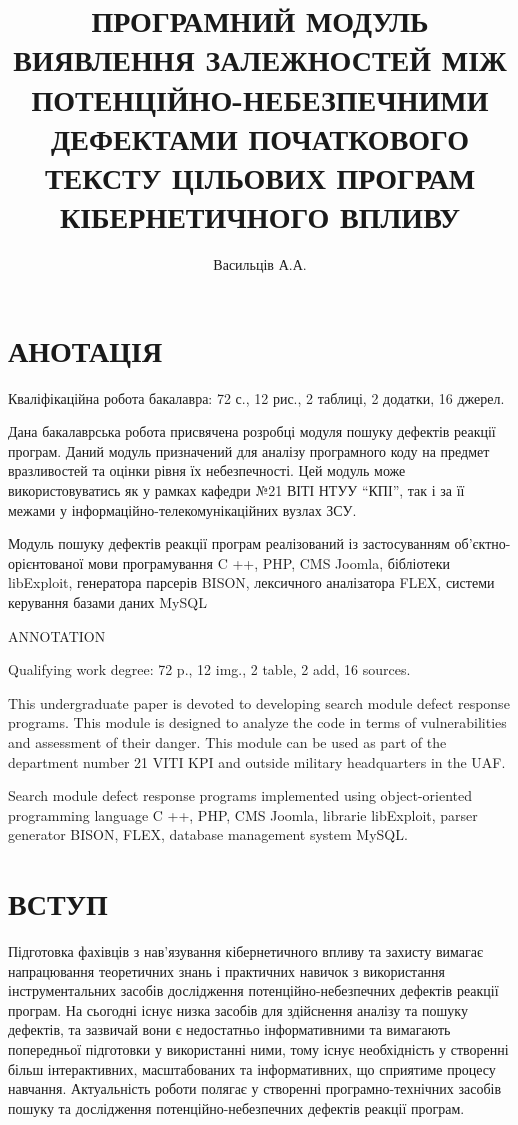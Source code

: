 \documentclass[oneside,final,14pt]{extreport}
\title{ПРОГРАМНИЙ МОДУЛЬ ВИЯВЛЕННЯ ЗАЛЕЖНОСТЕЙ МІЖ ПОТЕНЦІЙНО-НЕБЕЗПЕЧНИМИ ДЕФЕКТАМИ ПОЧАТКОВОГО ТЕКСТУ ЦІЛЬОВИХ ПРОГРАМ КІБЕРНЕТИЧНОГО ВПЛИВУ}
\author{Васильців А.А.}
\begin{document}
\maketitle %

\chapter*{АНОТАЦІЯ}
\label{0annotation:annotation}
Кваліфікаційна робота бакалавра: 72  с., 12  рис., 2  таблиці, 2 додатки, 16 джерел.

Дана бакалаврська робота присвячена розробці модуля пошуку дефектів реакції програм. Даний модуль призначений для аналізу програмного коду на предмет вразливостей та оцінки рівня їх небезпечності. Цей модуль може використовуватись як у рамках  кафедри №21 ВІТІ НТУУ “КПІ”, так і за її межами у інформаційно-телекомунікаційних вузлах ЗСУ.

Модуль пошуку дефектів реакції програм  реалізований із застосуванням об’єктно-орієнтованої мови програмування  C ++, PHP, CMS Joomla, бібліотеки libExploit, генератора парсерів BISON, лексичного аналізатора FLEX, системи керування базами даних MySQL 

ANNOTATION
\normalfont


Qualifying work degree: 72 p., 12 img., 2 table, 2 add, 16 sources.

This undergraduate paper is devoted to developing search module defect response programs. This module is designed to analyze the code in terms of vulnerabilities and assessment of their danger. This module can be used as part of the department number 21 VITI KPI and outside military headquarters in the UAF.

Search module defect response programs implemented using object-oriented programming language C ++, PHP, CMS Joomla, librarie libExploit, parser generator BISON, FLEX, database management system MySQL.
\pagebreak

\setcounter{tocdepth}{1}
\tableofcontents %
\newpage %
\chapter*{ВСТУП}
\label{1entrance::doc}\label{1entrance:id1}
Підготовка фахівців з нав’язування кібернетичного впливу та захисту вимагає напрацювання теоретичних знань і практичних навичок з використання інструментальних засобів дослідження потенційно-небезпечних дефектів реакції програм. На сьогодні існує низка засобів для здійснення аналізу та пошуку дефектів, та зазвичай вони є недостатньо інформативними та вимагають попередньої підготовки у використанні ними, тому існує необхідність у створенні більш інтерактивних, масштабованих та інформативних, що сприятиме процесу навчання. Актуальність роботи полягає у створенні програмно-технічних засобів пошуку та дослідження потенційно-небезпечних дефектів реакції програм.
\end{document}
